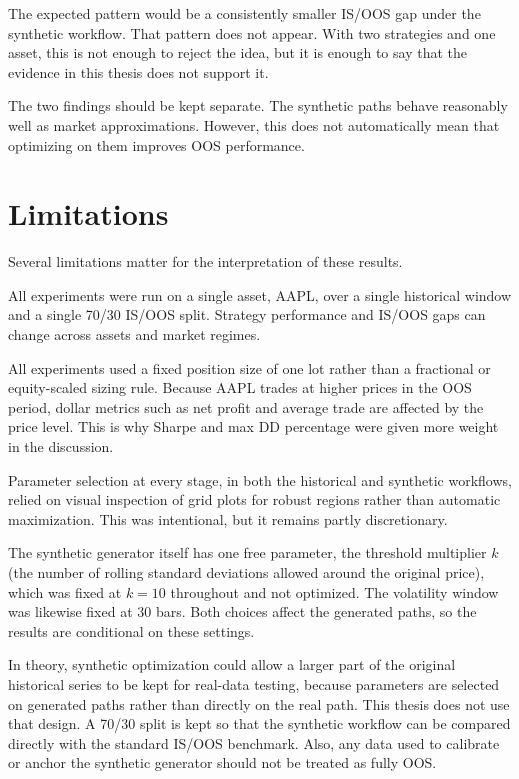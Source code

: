 The expected pattern would be a consistently smaller IS/OOS gap under the synthetic workflow. That
pattern does not appear. With two strategies and one asset, this is not enough to reject the idea, but
it is enough to say that the evidence in this thesis does not support it.

The two findings should be kept separate. The synthetic paths behave reasonably well as market
approximations. However, this does not automatically mean that optimizing on them improves OOS
performance.

\section{Limitations}

Several limitations matter for the interpretation of these results.

All experiments were run on a single asset, AAPL, over a single historical window and a single 70/30
IS/OOS split. Strategy performance and IS/OOS gaps can change across assets and market regimes.

All experiments used a fixed position size of one lot rather than a fractional or equity-scaled sizing
rule. Because AAPL trades at higher prices in the OOS period, dollar metrics such as net profit and
average trade are affected by the price level. This is why Sharpe and max DD percentage were given more
weight in the discussion.

Parameter selection at every stage, in both the historical and synthetic workflows, relied on visual
inspection of grid plots for robust regions rather than automatic maximization. This was intentional,
but it remains partly discretionary.

The synthetic generator itself has one free parameter, the threshold multiplier \(k\) (the number of
rolling standard deviations allowed around the original price), which was fixed at \(k = 10\)
throughout and not optimized. The volatility window was likewise fixed at 30 bars. Both choices affect
the generated paths, so the results are conditional on these settings.

In theory, synthetic optimization could allow a larger part of the original historical series to be
kept for real-data testing, because parameters are selected on generated paths rather than directly on
the real path. This thesis does not use that design. A 70/30 split is kept so that the synthetic
workflow can be compared directly with the standard IS/OOS benchmark. Also, any data used to calibrate
or anchor the synthetic generator should not be treated as fully OOS.

